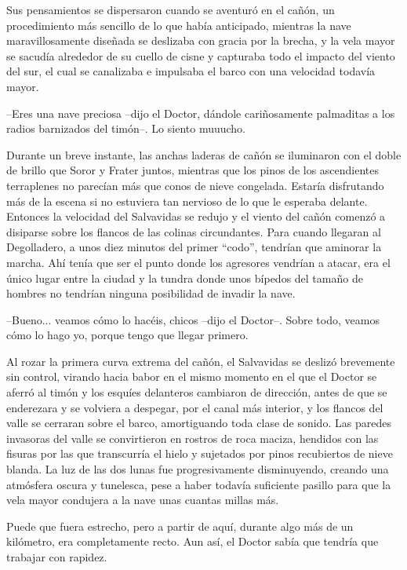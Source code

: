 Sus pensamientos se dispersaron cuando se aventuró en el cañón, un procedimiento más sencillo de lo que había anticipado, mientras la nave maravillosamente diseñada se deslizaba con gracia por la brecha, y la vela mayor se sacudía alrededor de su cuello de cisne y capturaba todo el impacto del viento del sur, el cual se canalizaba e impulsaba el barco con una velocidad todavía mayor.
 
--Eres una nave preciosa --dijo el Doctor, dándole cariñosamente palmaditas a los radios barnizados del timón--. Lo siento muuucho.
 
Durante un breve instante, las anchas laderas de cañón se iluminaron con el doble de brillo que Soror y Frater juntos, mientras que los pinos de los ascendientes terraplenes no parecían más que conos de nieve congelada. Estaría disfrutando más de la escena si no estuviera tan nervioso de lo que le esperaba delante. Entonces la velocidad del Salvavidas se redujo y el viento del cañón comenzó a disiparse sobre los flancos de las colinas circundantes. Para cuando llegaran al Degolladero, a unos diez minutos del primer ``codo'', tendrían que aminorar la marcha. Ahí tenía que ser el punto donde los agresores vendrían a atacar, era el único lugar entre la ciudad y la tundra donde unos bípedos del tamaño de hombres no tendrían ninguna posibilidad de invadir la nave.
 
--Bueno... veamos cómo lo hacéis, chicos --dijo el Doctor--. Sobre todo, veamos cómo lo hago yo, porque tengo que llegar primero.
 
Al rozar la primera curva extrema del cañón, el Salvavidas se deslizó brevemente sin control, virando hacia babor en el mismo momento en el que el Doctor se aferró al timón y los esquíes delanteros cambiaron de dirección, antes de que se enderezara y se volviera a despegar, por el canal más interior, y los flancos del valle se cerraran sobre el barco, amortiguando toda clase de sonido. Las paredes invasoras del valle se convirtieron en rostros de roca maciza, hendidos con las fisuras por las que transcurría el hielo y sujetados por pinos recubiertos de nieve blanda. La luz de las dos lunas fue progresivamente disminuyendo, creando una atmósfera oscura y tunelesca, pese a haber todavía suficiente pasillo para que la vela mayor condujera a la nave unas cuantas millas más.
 
Puede que fuera estrecho, pero a partir de aquí, durante algo más de un kilómetro, era completamente recto. Aun así, el Doctor sabía que tendría que trabajar con rapidez.
 
